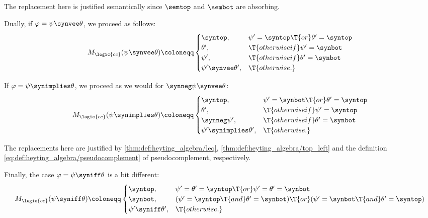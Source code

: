 \begin{algorithm}
\begin{thmenum}
    The replacement here is justified semantically since \( \semtop \) and \( \sembot \) are absorbing.

     Dually, if \( \varphi = \psi \synvee \theta \), we proceed as follows:
    \begin{equation*}
      M_{\logic{cc}}(\psi \synvee \theta) \coloneqq \begin{cases}
        \syntop,                   &\psi' = \syntop \T{or} \theta' = \syntop \\
        \theta',                   &\T{otherwise if} \psi' = \synbot \\
        \psi',                     &\T{otherwise if} \theta' = \synbot \\
        \psi' \synvee \theta',     &\T{otherwise.}
      \end{cases}
    \end{equation*}

     If \( \varphi = \psi \synimplies \theta \), we proceed as we would for \( \synneg \psi \synvee \theta \):
    \begin{equation*}
      M_{\logic{cc}}(\psi \synimplies \theta) \coloneqq \begin{cases}
        \syntop,                   &\psi' = \synbot \T{or} \theta' = \syntop \\
        \theta',                   &\T{otherwise if} \psi' = \syntop \\
        \synneg \psi',             &\T{otherwise if} \theta' = \synbot \\
        \psi' \synimplies \theta', &\T{otherwise.}
      \end{cases}
    \end{equation*}

    The replacements here are justified by \cref{thm:def:heyting_algebra/leq}, \cref{thm:def:heyting_algebra/top_left} and the definition \eqref{eq:def:heyting_algebra/pseudocomplement} of pseudocomplement, respectively.

     Finally, the case \( \varphi = \psi \syniff \theta \) is a bit different:
    \begin{equation*}
      M_{\logic{cc}}(\psi \syniff \theta) \coloneqq \begin{cases}
        \syntop,                   &\psi' = \theta' = \syntop \T{or} \psi' = \theta' = \synbot \\
        \synbot,                   &(\psi' = \syntop \T{and} \theta' = \synbot) \T{or} (\psi' = \synbot \T{and} \theta' = \syntop) \\
        \psi' \syniff \theta',     &\T{otherwise.}
      \end{cases}
    \end{equation*}
  \end{thmenum}
\end{algorithm}
